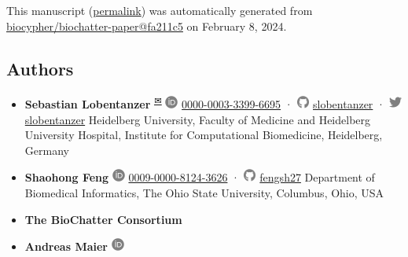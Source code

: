 This manuscript
(\href{https://biocypher.github.io/biochatter-paper/v/fa211c587abc5f7ea0e4687951a632ecd49f71b0/}{permalink})
was automatically generated
from \href{https://github.com/biocypher/biochatter-paper/tree/fa211c587abc5f7ea0e4687951a632ecd49f71b0}{biocypher/biochatter-paper@fa211c5}
on February 8, 2024.

\hypertarget{authors}{%
\subsection{Authors}\label{authors}}

\begin{itemize}
\item
  \textbf{Sebastian Lobentanzer}
  \textsuperscript{\protect\hyperlink{correspondence}{✉}}
  \includegraphics[width=0.16667in,height=0.16667in]{images/orcid.svg}
  \href{https://orcid.org/0000-0003-3399-6695}{0000-0003-3399-6695}
  · \includegraphics[width=0.16667in,height=0.16667in]{images/github.svg}
  \href{https://github.com/slobentanzer}{slobentanzer}
  · \includegraphics[width=0.16667in,height=0.16667in]{images/twitter.svg}
  \href{https://twitter.com/slobentanzer}{slobentanzer}
  Heidelberg University, Faculty of Medicine and Heidelberg University Hospital, Institute for Computational Biomedicine, Heidelberg, Germany
\item
  \textbf{Shaohong Feng}
  \includegraphics[width=0.16667in,height=0.16667in]{images/orcid.svg}
  \href{https://orcid.org/0009-0000-8124-3626}{0009-0000-8124-3626}
  · \includegraphics[width=0.16667in,height=0.16667in]{images/github.svg}
  \href{https://github.com/fengsh27}{fengsh27}
  Department of Biomedical Informatics, The Ohio State University, Columbus, Ohio, USA
\item
  \textbf{The BioChatter Consortium}
\item
  \textbf{Andreas Maier}
  \includegraphics[width=0.16667in,height=0.16667in]{images/orcid.svg}

\end{itemize}
